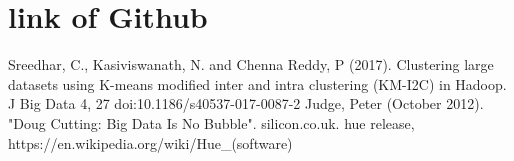 \documentclass[12pt, a4paper]{article}
\begin{document}
\section*{link of Github}


\begin{thebibliography}{9} 
 Sreedhar, C., Kasiviswanath, N. and Chenna Reddy, P (2017). Clustering large datasets using K-means modified inter and intra clustering (KM-I2C) in Hadoop. J Big Data 4, 27 doi:10.1186/s40537-017-0087-2
 Judge, Peter (October 2012). "Doug Cutting: Big Data Is No Bubble". silicon.co.uk.
 hue release, https://en.wikipedia.org/wiki/Hue_(software)

\end{thebibliography}
\end{document}
